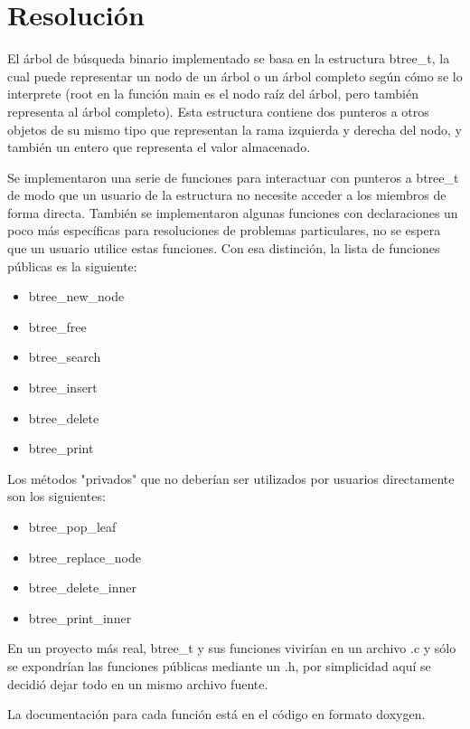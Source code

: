 \documentclass[a4paper,notitlepage]{article}
\begin{document}
\tableofcontents
\section{Resolución}
El árbol de búsqueda binario implementado se basa en la estructura btree{\_}t, la
cual puede representar un nodo de un árbol o un árbol completo según cómo se
lo interprete (root en la función main es el nodo raíz del árbol, pero también
representa al árbol completo). Esta estructura contiene dos punteros a otros
objetos de su mismo tipo que representan la rama izquierda y derecha del nodo,
y también un entero que representa el valor almacenado.

Se implementaron una serie de funciones para interactuar con punteros a btree{\_}t
de modo que un usuario de la estructura no necesite acceder a los miembros de
forma directa. También se implementaron algunas funciones con declaraciones un
poco más específicas para resoluciones de problemas particulares, no se espera
que un usuario utilice estas funciones. Con esa distinción, la lista de
funciones públicas es la siguiente:

\begin{itemize}
    \item btree{\_}new{\_}node
    \item btree{\_}free
    \item btree{\_}search
    \item btree{\_}insert
    \item btree{\_}delete
    \item btree{\_}print
\end{itemize}

Los métodos "privados" que no deberían ser utilizados por usuarios directamente
son los siguientes:

\begin{itemize}
    \item btree{\_}pop{\_}leaf
    \item btree{\_}replace{\_}node
    \item btree{\_}delete{\_}inner
    \item btree{\_}print{\_}inner
\end{itemize}

En un proyecto más real, btree{\_}t y sus funciones vivirían en un archivo .c
y sólo se expondrían las funciones públicas mediante un .h, por simplicidad
aquí se decidió dejar todo en un mismo archivo fuente.

La documentación para cada función está en el código en formato doxygen.
\end{document}
